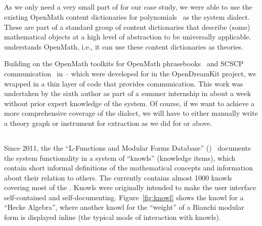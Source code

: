 \subsection{\Singular}

As we only need a very small part of \Singular for our case study, we were able to use the existing OpenMath content dictionaries for polynomials~\cite{OMCD:poly:on} as the \Singular system dialect.
These are part of a standard group of content dictionaries that describe (some) mathematical objects at a high level of abstraction to be universally applicable.
\OMMT understands OpenMath, i.e., it can use these content dictionaries as \OMMT theories.

Building on the OpenMath toolkits for OpenMath phrasebooks~\cite{py-openmath:on} and SCSCP communication~\cite{py-scscp:on} in {\Python} -- which were developed for \Sage in the
OpenDreamKit project, we wrapped \Singular in a thin layer of \Python code that provides \SCSCP communication.
This work was undertaken by the sixth author as part of a summer internship in about a week without prior expert knowledge of the system. Of course, if we want to achieve a more comprehensive coverage of the \Singular dialect, we will have to either manually write a theory graph or instrument \Singular for extraction as we did for \Sage or \GAP above. 

\subsection{\LMFDB}

Since 2011, the the ``L-Functions and Modular Forms Database'' (\LMFDB)~\cite{Cremona:LMFDB16,lmfdb:on} documents the system functionality in a system of ``knowls'' (knowledge items), which contain short informal definitions of the mathematical concepts and information about their relation to others.
The \LMFDB currently contains almost 1000 knowls covering most of the \LMFDB.
Knowls were originally intended to make the \LMFDB user interface self-contained and self-documenting.
Figure~\ref{fig:knowl} shows the knowl for a ``Hecke Algebra'', where another knowl for the ``weight'' of a Bianchi modular form is displayed inline (the typical mode of interaction with knowls). 

